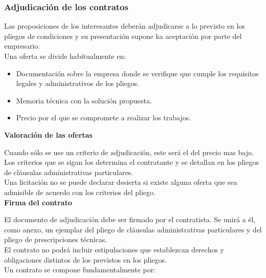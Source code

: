 \documentclass[12pt,spanish]{article}
\begin{document}
\subsubsection{Adjudicación de los contratos}

Las proposiciones de los interesantes deberán adjudicarse a lo previsto en los pliegos de condiciones y su presentación supone ka aceptación por parte del empresario.\\

Una oferta se divide habitualmente en:

\begin{itemize}
	\item Documentación sobre la empresa donde se verifique que cumple los requisitos legales y administrativos de los pliegos.
	\item Memoria técnica con la solución propuesta.
	\item Precio por el que se compromete a realizar los trabajos.
\end{itemize}

\textbf{Valoración de las ofertas\\}

Cuando sólo se use un criterio de adjudicación, este será el del precio mas bajo. Los criterios que se sigan los determina el contratante y se detallan en los pliegos de cláusulas administrativas particulares.\\

Una licitación no se puede declarar desierta si existe alguna oferta que sea admisible de acuerdo con los criterios del pliego.\\


\textbf{Firma del contrato\\}

El documento de adjudicación debe ser firmado por el contratista.  Se unirá a él, como anexo, un ejemplar del pliego de cláusulas administrativas particulares y del pliego de prescripciones técnicas.\\

El contrato no podrá incluir estipulaciones que establezcan derechos y obligaciones distintos de los previstos en los pliegos. \\

Un contrato se compone fundamentalmente por:
\end{document}
